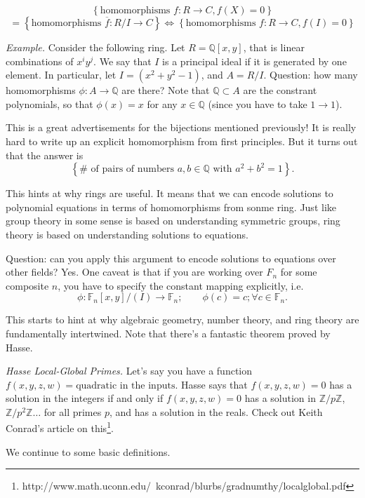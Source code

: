 \documentclass[12pt]{article}
\newcommand{\QQ}{\mathbb{Q}}
\newcommand{\FF}{\mathbb{F}}
\newcommand{\ol}{\overline}
\def\ZZ{\mathbb{Z}}
\begin{document}
  \[
    \left\{ \text{homomorphisms } f: R \to C, f(X) = 0 \right\} 
    \]
    \[
  = \left\{ \text{homomorphisms } \ol{f} : R / I \to C \right\} \Leftrightarrow \left\{ \text{homomorphisms } f: R \to C, f(I) = 0 \right\}
      \]

      {\it Example.} Consider the following ring.  Let $R = \QQ[x, y]$, that is linear combinations of $x^i y^j$.  We say that $I$ is a principal ideal if it is generated by one element.  In particular, let $I = (x^2 + y^2 - 1)$, and $A = R/I$.  Question: how many homomorphisms $\phi: A \to \QQ$ are there?  Note that $\QQ \subset A$ are the constrant polynomials, so that $\phi(x) = x$ for any $x \in \QQ$ (since you have to take $1 \to 1$).  
      
      This is a great advertisements for the bijections mentioned previously!  It is really hard to write up an explicit homomorphism from first principles.  But it turns out that the answer is
      \[
        \left\{ \text{# of pairs of numbers } a, b \in \QQ \text{ with } a^2 + b^2 = 1 \right\}.
        \]

        This hints at why rings are useful.  It means that we can encode solutions to polynomial equations in terms of homomorphisms from sonme ring.  Just like group theory in some sense is based on understanding symmetric groups, ring theory is based on understanding solutions to equations.

        Question: can you apply this argument to encode solutions to equations over other fields?  Yes.  One caveat is that if you are working over $F_n$ for some composite $n$, you have to specify the constant mapping explicitly, i.e.
        \[
          \phi: \FF_n [x, y] / (I) \to \FF_n; \qquad \phi(c) = c; \forall c \in \FF_n.
        \]


        This starts to hint at why algebraic geometry, number theory, and ring theory are fundamentally intertwined.  Note that there's a fantastic theorem proved by Hasse.

        {\it Hasse Local-Global Primes.}  Let's say you have a function $f(x, y, z, w) = \text{quadratic in the inputs}$.  Hasse says that $f(x, y, z, w) = 0$ has a solution in the integers if and only if $f(x, y, z, w) = 0$ has a solution in $\ZZ / p \ZZ$, $\ZZ / p^2 \ZZ \dots $ for all primes $p$, and has a solution in the reals.  Check out Keith Conrad's article on this\footnote{http://www.math.uconn.edu/~kconrad/blurbs/gradnumthy/localglobal.pdf}.

        We continue to some basic definitions.
\end{document}
